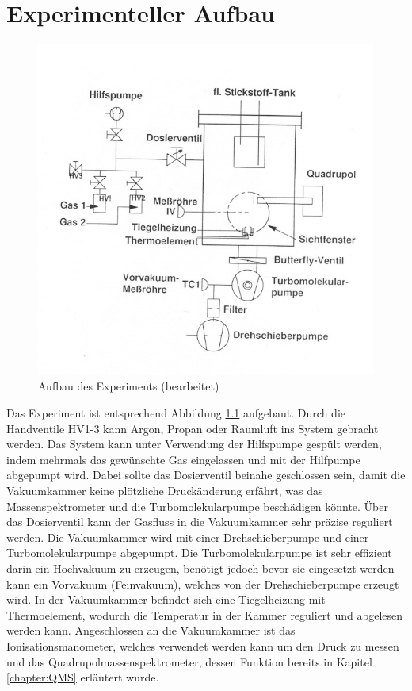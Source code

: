 \chapter{Experimenteller Aufbau}
\begin{figure}
    \centering
    \includegraphics[width=130mm,scale=0.8]{Massenspektrometer/include/Massenspektrometer_Aufbau.png}
    \caption{Aufbau des Experiments \cite{VorbereitungsMappe}(bearbeitet)}
    \label{fig:aufbau}
\end{figure}
Das Experiment ist entsprechend  Abbildung \ref{fig:aufbau} aufgebaut. Durch die Handventile HV1-3 kann Argon, Propan oder Raumluft ins System gebracht werden. Das System kann unter Verwendung der Hilfspumpe gespült werden, indem mehrmals das gewünschte Gas eingelassen und mit der Hilfpumpe abgepumpt wird. Dabei sollte das Dosierventil beinahe geschlossen sein, damit die Vakuumkammer keine plötzliche Druckänderung erfährt, was das Massenspektrometer und die Turbomolekularpumpe beschädigen könnte. Über das Dosierventil kann der Gasfluss in die Vakuumkammer sehr präzise reguliert werden. Die Vakuumkammer wird mit einer Drehschieberpumpe und einer Turbomolekularpumpe abgepumpt. Die Turbomolekularpumpe ist sehr effizient darin ein Hochvakuum zu erzeugen, benötigt jedoch bevor sie eingesetzt werden kann ein Vorvakuum (Feinvakuum), welches von der Drehschieberpumpe erzeugt wird. In der Vakuumkammer befindet sich eine Tiegelheizung mit Thermoelement, wodurch die Temperatur in der Kammer reguliert und abgelesen werden kann. Angeschlossen an die Vakuumkammer ist das Ionisationsmanometer, welches verwendet werden kann um den Druck zu messen und das Quadrupolmassenspektrometer, dessen Funktion bereits in Kapitel \ref{chapter:QMS} erläutert wurde.